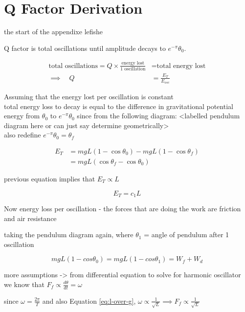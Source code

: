 \documentclass[main.tex]{subfiles}
\begin{document}
\section{Q Factor Derivation}
the start of the appendixe
lefishe

Q factor is total oscillations until amplitude decays to $e^{-\pi}\theta_0$.

\begin{align*}
    \text{total oscillations} = Q \times \frac{\text{energy lost}}{\text{1 oscillation}} &= \text{total energy lost} \\
    \implies \quad Q &= \frac{E_T}{E_{osc}}
\end{align*}

Assuming that the energy lost per oscillation is constant \\

total energy loss to decay is equal to the difference in gravitational potential energy from $\theta_0$ to $e^{-\pi}\theta_0$ since from the following diagram:
<labelled pendulum diagram here or can just say determine geometrically> \\

also redefine $e^{-\pi}\theta_0 = \theta_f$

\begin{align*}
    E_T &= mgL(1-\cos\theta_0) - mgL(1-\cos\theta_f)\\
    &= mgL(\cos\theta_f-\cos\theta_0)
\end{align*}

previous equation implies that $E_T \propto L$

\begin{equation}
    E_T = c_1 L
\end{equation}

Now energy loss per oscillation - the forces that are doing the work are friction and air resistance

taking the pendulum diagram again, where $\theta_1$ = angle of pendulum after 1 oscillation

\begin{equation}
    mgL(1-cos\theta_0) = mgL(1-cos\theta_1) = W_{f} + W_{d}
\end{equation}

more assumptions -> from differential equation to solve for harmonic oscillator we know that $F_f \propto \frac{d\theta}{dt} = \omega$

since $\omega = \frac{2\pi}{T}$ and also Equation \ref{eq:l-over-g}, $\omega \propto \frac{1}{\sqrt{L}} \implies F_f \propto \frac{1}{\sqrt{L}}$
\end{document}
